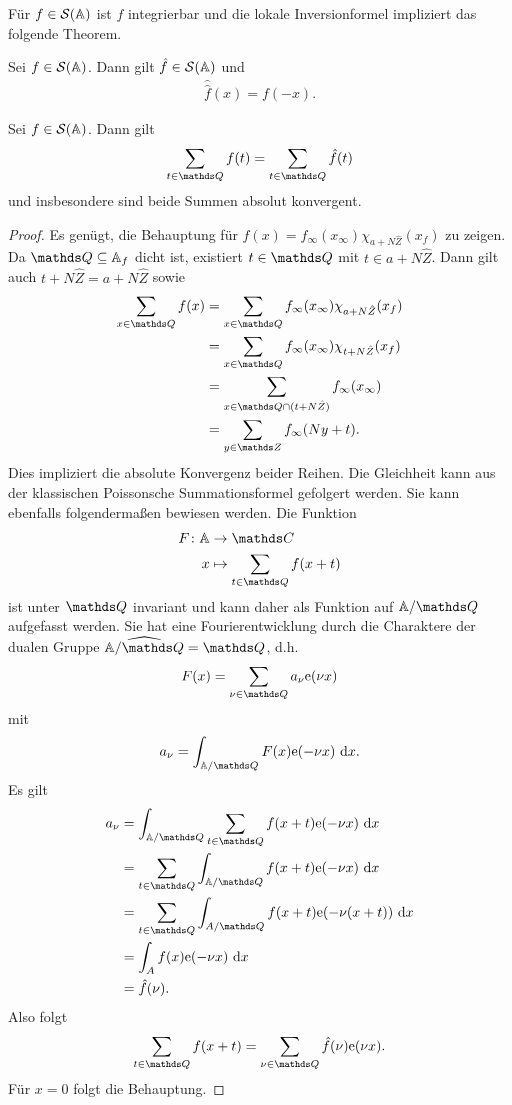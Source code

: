 Für $f \in \mathcal{S}(\mathbb{A})$ ist $f$ integrierbar und die lokale Inversionformel impliziert das folgende Theorem.

\begin{thm}
Sei $f \in \mathcal{S}(\mathbb{A})$. Dann gilt $\hat{f}\in \mathcal{S}(\mathbb{A})$ und
\begin{align*}
\hat{\hat{f}}(x)=f(-x).
\end{align*}
\end{thm}

\begin{thm}
Sei $f\in \mathcal{S}(\mathbb{A})$. Dann gilt
\begin{align*}
\sum_{t \in\Q} f(t)=\sum_{t \in \Q}\hat{f}(t)
\end{align*}
und insbesondere sind beide Summen absolut konvergent.
\end{thm}
\begin{proof}
Es genügt, die Behauptung für $f(x)=f_\infty(x_\infty)\chi_{a+N\hat{Z}}(x_f)$ zu zeigen.
Da $\Q\subseteq \A_f$ dicht ist, existiert $t\in \Q$ mit $t \in a+N\hat{Z}$.
Dann gilt auch $t+N\hat{Z}=a+N\hat{Z}$ sowie
\begin{align*}
\sum_{x\in \Q} f(x)&=\sum_{x\in \Q} f_\infty(x_\infty)\chi_{a+N\hat{Z}}(x_f) \\
&=\sum_{x\in \Q} f_\infty(x_\infty)\chi_{t+N\hat{Z}}(x_f)\\
&=\sum_{x\in \Q \cap (t+N\hat{Z})} f_\infty(x_\infty)\\
&=\sum_{y\in \Z} f_\infty(Ny+t).
\end{align*}
Dies impliziert die absolute Konvergenz beider Reihen.
Die Gleichheit kann aus der klassischen Poissonsche Summationsformel gefolgert werden.
Sie kann ebenfalls folgendermaßen bewiesen werden.
Die Funktion
\begin{align*}
F \colon \A &\to \C\\
x &\mapsto \sum_{t\in \Q} f(x+t)
\end{align*}
ist unter $\Q$ invariant und kann daher als Funktion auf $\A/\Q$ aufgefasst werden.
Sie hat eine Fourierentwicklung durch die Charaktere der dualen Gruppe $\widehat{\A/\Q}=\Q$, d.h.\,
\begin{align*}
F(x)=\sum_{\nu \in \Q} a_\nu \ex(\nu x)
\end{align*}
mit
\begin{align*}
a_\nu=\int_{\A/\Q} F(x)\ex(-\nu x)~\mathrm{d}x.
\end{align*}
Es gilt
\begin{align*}
a_\nu&=\int_{\A/\Q} \sum_{t \in \Q} f(x+t) \ex(-\nu x)~\mathrm{d}x\\
&= \sum_{t\in \Q} \int_{\A /\Q} f(x+t)\ex(-\nu x)~\mathrm{d}x\\
&= \sum_{t \in \Q} \int_{A /\Q} f(x+t)\ex(-\nu(x+t))~\mathrm{d}x\\
&=\int_A f(x) \ex(-\nu x)~\mathrm{d}x\\
&=\hat{f}(\nu).
\end{align*}
Also folgt
\begin{align*}
\sum_{t \in \Q} f(x+t)=\sum_{\nu \in \Q} \hat{f}(\nu)\ex(\nu x).
\end{align*}
Für $x=0$ folgt die Behauptung.
\end{proof}